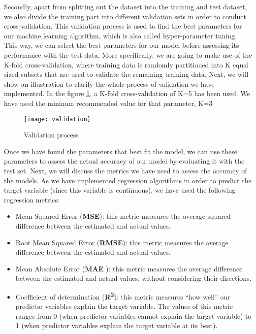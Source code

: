 Secondly, apart from splitting out the dataset into the training and test dataset, we also divide the training part into different validation sets in order to conduct cross-validation. This validation process is used to find the best parameters for our machine learning algorithm, which is also called hyper-parameter tuning. This way, we can select the best parameters for our model before assessing its performance with the test data. More specifically, we are going to make use of the K-fold cross-validation, where training data is randomly partitioned into K equal sized subsets that are used to validate the remaining training data. Next, we will show an illustration to clarify the whole process of validation we have implemented. In the figure \ref{fig:validation}, a K-fold cross-validation of K=5 has been used. We have used the mininum recommended value for that parameter, K=3\\

\begin{figure}[H]
	\centering
	\texttt{[image: validation]}
	\caption{Validation process}
	\label{fig:validation}
\end{figure}

Once we have found the parameters that best fit the model, we can use these parameters to assess the actual accuracy of our model by evaluating it with the test set. Next, we will discuss the metrics we have used to assess the accuracy of the models. As we have implemented regression algorithms in order to predict the target variable (since this variable is continuous), we have used the following regression metrics:

\begin{itemize}

	\item Mean Squared Error (\textbf{MSE}): this metric measures the average squared difference between the estimated and actual values.
	
	\item Root Mean Squared Error (\textbf{RMSE}): this metric measures the average difference between the estimated and actual values.
	
	\item Mean Absolute Error (\textbf{MAE} ): this metric measures the average difference between the estimated and actual values, without considering their directions.
	
	\item Coefficient of determination (\textbf{R\textsuperscript{2}}): this metric measures “how well” our predictor variables explain the target variable. The values of this metric ranges from 0 (when predictor variables cannot explain the target variable) to 1 (when predictor variables explain the target variable at its best).

\end{itemize}


